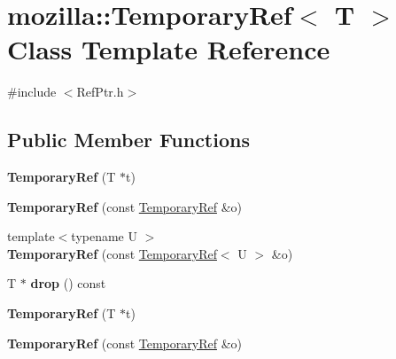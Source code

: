 \hypertarget{classmozilla_1_1_temporary_ref}{\section{mozilla\-:\-:Temporary\-Ref$<$ T $>$ Class Template Reference}
\label{classmozilla_1_1_temporary_ref}
}


{\ttfamily \#include $<$Ref\-Ptr.\-h$>$}

\subsection*{Public Member Functions}
\begin{DoxyCompactItemize}
\item 
\hypertarget{classmozilla_1_1_temporary_ref_a1a222cf19d19ecae613cb5ef4301b0ff}{{\bfseries Temporary\-Ref} (T $\ast$t)}\label{classmozilla_1_1_temporary_ref_a1a222cf19d19ecae613cb5ef4301b0ff}

\item 
\hypertarget{classmozilla_1_1_temporary_ref_a8822af4d395f6ae8be513a140bca01bf}{{\bfseries Temporary\-Ref} (const \hyperlink{classmozilla_1_1_temporary_ref}{Temporary\-Ref} \&o)}\label{classmozilla_1_1_temporary_ref_a8822af4d395f6ae8be513a140bca01bf}

\item 
\hypertarget{classmozilla_1_1_temporary_ref_aa18f235c1cbb895e5b5fddf18a83e68d}{{\footnotesize template$<$typename U $>$ }\\{\bfseries Temporary\-Ref} (const \hyperlink{classmozilla_1_1_temporary_ref}{Temporary\-Ref}$<$ U $>$ \&o)}\label{classmozilla_1_1_temporary_ref_aa18f235c1cbb895e5b5fddf18a83e68d}

\item 
\hypertarget{classmozilla_1_1_temporary_ref_a2dd073d4eb62ad4cd25574033492b1be}{T $\ast$ {\bfseries drop} () const }\label{classmozilla_1_1_temporary_ref_a2dd073d4eb62ad4cd25574033492b1be}

\item 
\hypertarget{classmozilla_1_1_temporary_ref_a1a222cf19d19ecae613cb5ef4301b0ff}{{\bfseries Temporary\-Ref} (T $\ast$t)}\label{classmozilla_1_1_temporary_ref_a1a222cf19d19ecae613cb5ef4301b0ff}

\item 
\hypertarget{classmozilla_1_1_temporary_ref_a8822af4d395f6ae8be513a140bca01bf}{{\bfseries Temporary\-Ref} (const \hyperlink{classmozilla_1_1_temporary_ref}{Temporary\-Ref} \&o)}\label{classmozilla_1_1_temporary_ref_a8822af4d395f6ae8be513a140bca01bf}


\end{DoxyCompactItemize}
